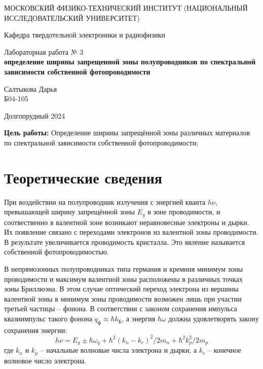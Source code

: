 \documentclass[a4paper,12pt]{article} %
\begin{document}
	
	\begin{titlepage}
	\begin{center}
		{\large МОСКОВСКИЙ ФИЗИКО-ТЕХНИЧЕСКИЙ ИНСТИТУТ (НАЦИОНАЛЬНЫЙ ИССЛЕДОВАТЕЛЬСКИЙ УНИВЕРСИТЕТ)}
	\end{center}
	\begin{center}
		{\large Кафедра твердотельной электроники и радиофизики}
	\end{center}
	
	
	\vspace{4.5cm}
	{\huge
		\begin{center}
			{Лабораторная работа № 3}\\
			\textbf{определение ширины запрещенной зоны
полупроводников по спектральной зависимости
собственной фотопроводимости}
		\end{center}
	}
	\vspace{2cm}
	\begin{flushright}
		{\LARGE Салтыкова Дарья \\
			\vspace{0.5cm}
			Б04-105}
	\end{flushright}
	\vspace{8cm}
	\begin{center}
		Долгопрудный 2024
	\end{center}
\end{titlepage}








\noindent \textbf{ \Large Цель работы:} Определение ширины запрещённой зоны различных материалов по спектральной зависимости собственной фотопроводимости;


\section{Теоретические сведения}
При воздействии на полупроводник излучения с энергией кванта $h\nu$, превышающей ширину запрещённой зоны $E_g$ в зоне проводимости, и соотвественно в валентной зоне возникают неравновесные электроны и дырки. Их появление связано с переходами электронов из валентной зоны проводимости. В результате увеличивается проводимость кристалла. Это явление называется собственной фотопроводимостью.

В непрямозонных полупроводниках типа германия и кремния минимум зоны проводимости и максимум валентной зоны расположены в различных точках зоны Бриллюэна. В этом случае оптический переход электрона из вершины валентной зоны в минимум зоны проводимости возможен лишь при участии третьей частицы – фонона. В соответствии с законом сохранения импульса квазиимпульс такого фонона $q_{\text{ф}}\approx\hbar k_{\text{Б}}$, а энергия $\hbar\omega$ должна удовлетворять закону сохранения энергии:
\begin{equation}
    h\nu = E_g\pm \hbar\omega_q+\hbar^2(k_n-k_c)^2/2m_n+\hbar^2k_p^2/2m_p
\end{equation}
где $k_n$ и $k_p$ -- начальные волновые числа электрона и дырки, а $k_c$ -- конечное волновое число электрона.
\end{document}
